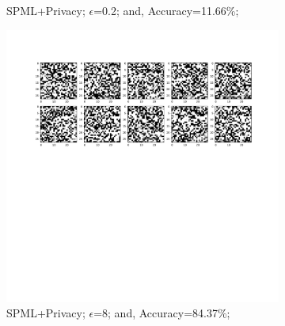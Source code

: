 \begin{figure}
\begin{subfigure}{.325\textwidth}
         \vspace{-8em}
         \caption{SPML+Privacy; $\epsilon$=0.2; and, Accuracy=11.66\%;}
         \label{fig:simEps.2}
     \end{subfigure}
     \begin{subfigure}{.325\textwidth}
         \includegraphics[width=\textwidth]{images/Sim_attack/Mnistattack8.pdf}
         \vspace{-8em}
         \caption{SPML+Privacy; $\epsilon$=8; and, Accuracy=84.37\%;}
         \label{fig:simEps8}
     \end{subfigure}
        \caption{Model inversion attack images - Simulation mode without Intel SGX and with SCONE}
     \begin{subfigure}{.325\textwidth}

\end{subfigure}
\end{figure}
